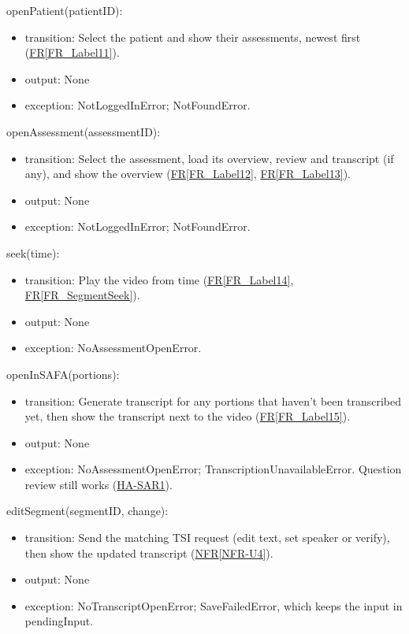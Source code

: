 \documentclass[12pt, titlepage]{article}
\newcommand{\srsref}[2]{\href{https://github.com/Nour-Fawaz/MacaBoca/blob/main/pdfs/SRS/SRS.pdf}{#1\ref*{#2}}}
\newcommand{\hazref}[1]{\href{https://github.com/Nour-Fawaz/MacaBoca/blob/main/pdfs/HazardAnalysis/HazardAnalysis.pdf}{#1}}
\begin{document}
\noindent openPatient(patientID):
\begin{itemize}
\item transition: Select the patient and show their assessments, newest first (\srsref{FR}{FR_Label11}).
\item output: None
\item exception: NotLoggedInError; NotFoundError.
\end{itemize}

\noindent openAssessment(assessmentID):
\begin{itemize}
\item transition: Select the assessment, load its overview, review and transcript (if any), and show the overview (\srsref{FR}{FR_Label12}, \srsref{FR}{FR_Label13}).
\item output: None
\item exception: NotLoggedInError; NotFoundError.
\end{itemize}

\noindent seek(time):
\begin{itemize}
\item transition: Play the video from time (\srsref{FR}{FR_Label14}, \srsref{FR}{FR_SegmentSeek}).
\item output: None
\item exception: NoAssessmentOpenError.
\end{itemize}

\noindent openInSAFA(portions):
\begin{itemize}
\item transition: Generate transcript for any portions that haven't been transcribed yet, then show the transcript next to the video (\srsref{FR}{FR_Label15}).
\item output: None
\item exception: NoAssessmentOpenError; TranscriptionUnavailableError. Question review still works (\hazref{HA-SAR1}).
\end{itemize}

\noindent editSegment(segmentID, change):
\begin{itemize}
\item transition: Send the matching TSI request (edit text, set speaker or verify), then show the updated transcript (\srsref{NFR}{NFR-U4}).
\item output: None
\item exception: NoTranscriptOpenError; SaveFailedError, which keeps the input in pendingInput.
\end{itemize}
\end{document}
